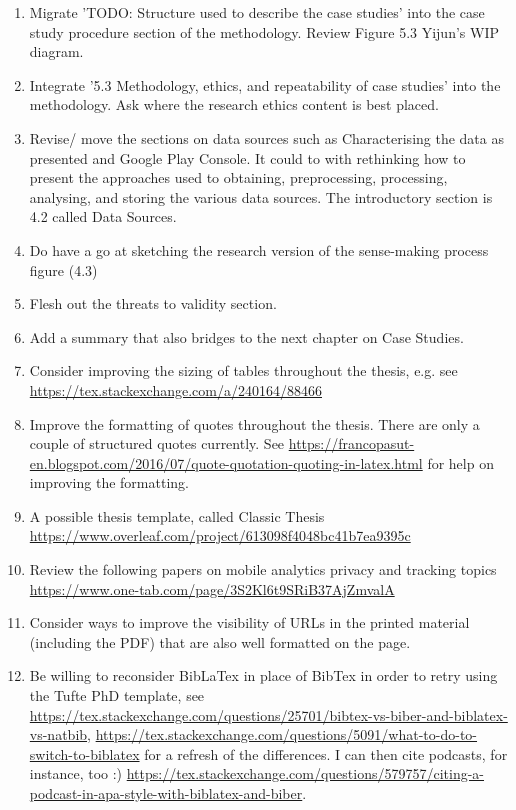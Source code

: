 \begin{enumerate}
    \item Migrate 'TODO: Structure used to describe the case studies' into the case study procedure section of the methodology. Review Figure 5.3 Yijun's WIP diagram.

    \item Integrate '5.3 Methodology, ethics, and repeatability of case studies' into the methodology. Ask where the research ethics content is best placed.

    \item Revise/ move the sections on data sources such as Characterising the data as presented and Google Play Console. It could to with rethinking how to present the approaches used to obtaining, preprocessing, processing, analysing, and storing the various data sources. The introductory section is 4.2 called Data Sources.

    \item Do have a go at sketching the research version of the sense-making process figure (4.3)

    \item Flesh out the threats to validity section.

    \item Add a summary that also bridges to the next chapter on Case Studies.
    
    \item Consider improving the sizing of tables throughout the thesis, e.g. see \url{https://tex.stackexchange.com/a/240164/88466}
    
    \item Improve the formatting of quotes throughout the thesis. There are only a couple of structured quotes currently. See \url{https://francopasut-en.blogspot.com/2016/07/quote-quotation-quoting-in-latex.html} for help on improving the formatting.
    
    \item A possible thesis template, called Classic Thesis \url{https://www.overleaf.com/project/613098f4048bc41b7ea9395c}
    
    \item Review the following papers on mobile analytics privacy and tracking topics \url{https://www.one-tab.com/page/3S2Kl6t9SRiB37AjZmvalA}
    
    \item Consider ways to improve the visibility of URLs in the printed material (including the PDF) that are also well formatted on the page.
    
    \item Be willing to reconsider BibLaTex in place of BibTex in order to retry using the Tufte PhD template, see \url{https://tex.stackexchange.com/questions/25701/bibtex-vs-biber-and-biblatex-vs-natbib}, \url{https://tex.stackexchange.com/questions/5091/what-to-do-to-switch-to-biblatex} for a refresh of the differences. I can then cite podcasts, for instance, too :) \url{https://tex.stackexchange.com/questions/579757/citing-a-podcast-in-apa-style-with-biblatex-and-biber}.
    

\end{enumerate}

